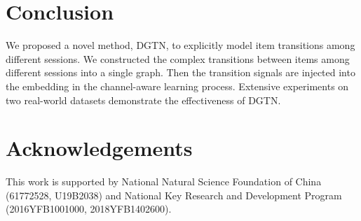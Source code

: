 \documentclass[conference]{IEEEtran}
\begin{document}
 
\section{Conclusion}
\label{c}
We proposed a novel method, DGTN, to explicitly model item transitions among different sessions. We constructed the complex transitions between items among different sessions into a single graph. Then the transition signals are injected into the embedding in the channel-aware learning process. Extensive experiments on two real-world datasets demonstrate the effectiveness of DGTN.

\section*{Acknowledgements}
This work is supported by National Natural Science Foundation of China (61772528, U19B2038) and National Key Research and Development Program (2016YFB1001000, 2018YFB1402600).







\end{document}
